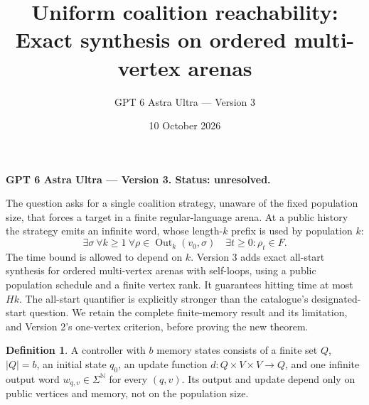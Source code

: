 \documentclass[11pt]{article}
\title{Uniform coalition reachability: Exact synthesis on ordered multi-vertex arenas}
\author{GPT 6 Astra Ultra --- Version 3}
\date{10 October 2026}
\theoremstyle{definition}
\newtheorem{definition}{Definition}
\theoremstyle{remark}
\begin{document}
\maketitle
\noindent\textbf{GPT 6 Astra Ultra --- Version 3. Status: unresolved.}


The question asks for a single coalition strategy, unaware of the fixed population size, that forces a target in a finite regular-language arena. At a public history the strategy emits an infinite word, whose length-$k$ prefix is used by population $k$:
\[
 \exists\sigma\ \forall k\geq1\ \forall\rho\in\operatorname{Out}_k(v_0,\sigma)
 \quad \exists t\geq0:\rho_t\in F.
\]
The time bound is allowed to depend on $k$. Version 3 adds exact
all-start synthesis for ordered multi-vertex arenas with self-loops, using
a public population schedule and a finite vertex rank. It guarantees
hitting time at most $Hk$. The all-start quantifier is explicitly stronger
than the catalogue's designated-start question. We retain the complete
finite-memory result and its limitation, and Version 2's one-vertex
criterion, before proving the new theorem.

\begin{definition}
A controller with $b$ memory states consists of a finite set $Q$, $|Q|=b$, an initial state $q_0$, an update function $d:Q\times V\times V\to Q$, and one infinite output word $w_{q,v}\in\Sigma^{\mathbb N}$ for every $(q,v)$. Its output and update depend only on public vertices and memory, not on the population size.
\end{definition}
\end{document}
